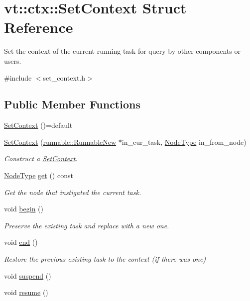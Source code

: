 \hypertarget{structvt_1_1ctx_1_1_set_context}{}\section{vt\+:\+:ctx\+:\+:Set\+Context Struct Reference}
\label{structvt_1_1ctx_1_1_set_context}


Set the context of the current running task for query by other components or users.  




{\ttfamily \#include $<$set\+\_\+context.\+h$>$}

\subsection*{Public Member Functions}
\begin{DoxyCompactItemize}
\item 
\hyperlink{structvt_1_1ctx_1_1_set_context_afe7801893d4377046b6fc91c003bd883}{Set\+Context} ()=default
\item 
\hyperlink{structvt_1_1ctx_1_1_set_context_a97e3ed34824011a693dec0a7d01f668b}{Set\+Context} (\hyperlink{structvt_1_1runnable_1_1_runnable_new}{runnable\+::\+Runnable\+New} $\ast$in\+\_\+cur\+\_\+task, \hyperlink{namespacevt_a866da9d0efc19c0a1ce79e9e492f47e2}{Node\+Type} in\+\_\+from\+\_\+node)
\begin{DoxyCompactList}\small\item\em Construct a {\ttfamily \hyperlink{structvt_1_1ctx_1_1_set_context}{Set\+Context}}. \end{DoxyCompactList}\item 
\hyperlink{namespacevt_a866da9d0efc19c0a1ce79e9e492f47e2}{Node\+Type} \hyperlink{structvt_1_1ctx_1_1_set_context_ab809e42e05e4ee549fbecc6962307d77}{get} () const
\begin{DoxyCompactList}\small\item\em Get the node that instigated the current task. \end{DoxyCompactList}\item 
void \hyperlink{structvt_1_1ctx_1_1_set_context_a5774b240e83dad26f04c6030f9922358}{begin} ()
\begin{DoxyCompactList}\small\item\em Preserve the existing task and replace with a new one. \end{DoxyCompactList}\item 
void \hyperlink{structvt_1_1ctx_1_1_set_context_a8c7f47ebcd80b28a115fd0e929d89434}{end} ()
\begin{DoxyCompactList}\small\item\em Restore the previous existing task to the context (if there was one) \end{DoxyCompactList}\item 
void \hyperlink{structvt_1_1ctx_1_1_set_context_aabc5e6b4061b15b07c42a0ec8108f829}{suspend} ()
\item 
void \hyperlink{structvt_1_1ctx_1_1_set_context_ab9cfd26c1453f6ab9ae5d9b3463676e0}{resume} ()
\end{DoxyCompactItemize}
